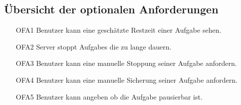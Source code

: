 \documentclass[a4paper,12pt]{article}
\begin{document}
\newpage

\subsection{Übersicht der optionalen Anforderungen}
\begin{itemize}[nosep]
\leftskip=0.5cm
\item[OFA1] \gls{Benutzer} kann eine geschätzte Restzeit einer \gls{Aufgabe} sehen.
\item[OFA2] \gls{Server} stoppt \glspl{Aufgabe} die zu lange dauern.
\item[OFA3] \gls{Benutzer} kann eine manuelle Stoppung seiner \gls{Aufgabe} anfordern.
\item[OFA4] \gls{Benutzer} kann eine manuelle Sicherung seiner \gls{Aufgabe} anfordern.
\item[OFA5] \gls{Benutzer} kann angeben ob die \gls{Aufgabe} pausierbar ist.
\end{itemize}
\newpage
\end{document}
